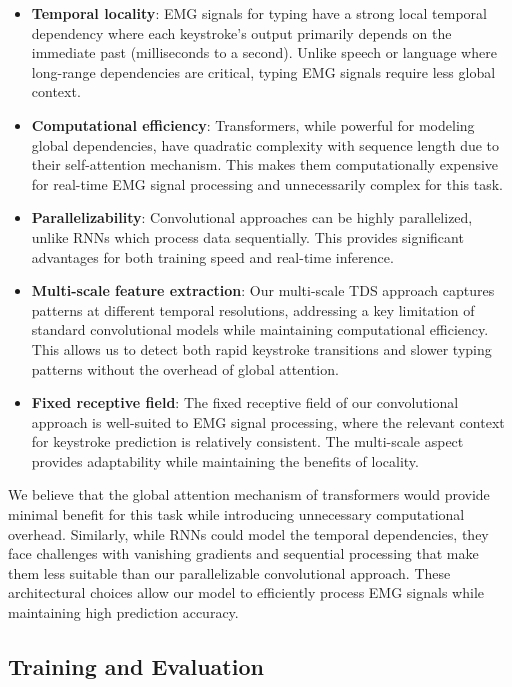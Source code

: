 \begin{itemize}
    \item \textbf{Temporal locality}: EMG signals for typing have a strong local temporal dependency where each keystroke's output primarily depends on the immediate past (milliseconds to a second). Unlike speech or language where long-range dependencies are critical, typing EMG signals require less global context.

    \item \textbf{Computational efficiency}: Transformers, while powerful for modeling global dependencies, have quadratic complexity with sequence length due to their self-attention mechanism. This makes them computationally expensive for real-time EMG signal processing and unnecessarily complex for this task.

    \item \textbf{Parallelizability}: Convolutional approaches can be highly parallelized, unlike RNNs which process data sequentially. This provides significant advantages for both training speed and real-time inference.

    \item \textbf{Multi-scale feature extraction}: Our multi-scale TDS approach captures patterns at different temporal resolutions, addressing a key limitation of standard convolutional models while maintaining computational efficiency. This allows us to detect both rapid keystroke transitions and slower typing patterns without the overhead of global attention.

    \item \textbf{Fixed receptive field}: The fixed receptive field of our convolutional approach is well-suited to EMG signal processing, where the relevant context for keystroke prediction is relatively consistent. The multi-scale aspect provides adaptability while maintaining the benefits of locality.
\end{itemize}

We believe that the global attention mechanism of transformers would provide minimal benefit for this task while introducing unnecessary computational overhead. Similarly, while RNNs could model the temporal dependencies, they face challenges with vanishing gradients and sequential processing that make them less suitable than our parallelizable convolutional approach. These architectural choices allow our model to efficiently process EMG signals while maintaining high prediction accuracy.

\subsection{Training and Evaluation}\label{subsec:training}

